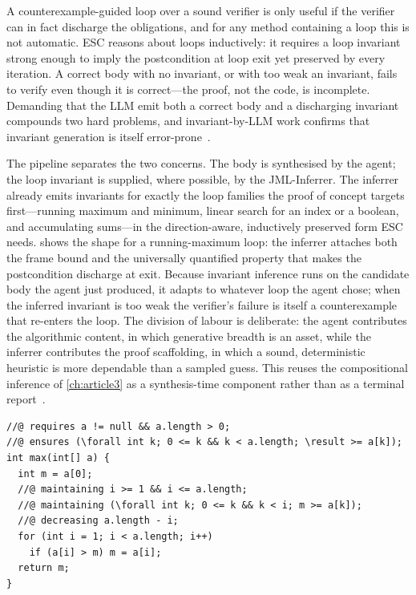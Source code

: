 A counterexample-guided loop over a sound verifier is only useful if the verifier can in fact discharge the obligations, and for any method containing a loop this is not automatic. ESC reasons about loops inductively: it requires a loop invariant strong enough to imply the postcondition at loop exit yet preserved by every iteration. A correct body with no invariant, or with too weak an invariant, fails to verify even though it is correct---the proof, not the code, is incomplete. Demanding that the LLM emit both a correct body and a discharging invariant compounds two hard problems, and invariant-by-LLM work confirms that invariant generation is itself error-prone~\cite{kamath2023loopy,chakraborty2023ranking,pei2023llminvariants}.

The pipeline separates the two concerns. The body is synthesised by the agent; the loop invariant is supplied, where possible, by the JML-Inferrer. The inferrer already emits invariants for exactly the loop families the proof of concept targets first---running maximum and minimum, linear search for an index or a boolean, and accumulating sums---in the direction-aware, inductively preserved form ESC needs.  shows the shape for a running-maximum loop: the inferrer attaches both the frame bound and the universally quantified property that makes the postcondition discharge at exit. Because invariant inference runs on the candidate body the agent just produced, it adapts to whatever loop the agent chose; when the inferred invariant is too weak the verifier's failure is itself a counterexample that re-enters the loop. The division of labour is deliberate: the agent contributes the algorithmic content, in which generative breadth is an asset, while the inferrer contributes the proof scaffolding, in which a sound, deterministic heuristic is more dependable than a sampled guess. This reuses the compositional inference of \cref{ch:article3} as a synthesis-time component rather than as a terminal report~\cite{edmonds_article3}.

\begin{lstlisting}[style=code,caption={A loop body synthesised by the agent (running maximum) annotated with the loop invariant supplied by the inferrer; the quantified clause is what lets ESC discharge the postcondition at loop exit.},label={lst:a5-invariant}]
//@ requires a != null && a.length > 0;
//@ ensures (\forall int k; 0 <= k && k < a.length; \result >= a[k]);
int max(int[] a) {
  int m = a[0];
  //@ maintaining i >= 1 && i <= a.length;
  //@ maintaining (\forall int k; 0 <= k && k < i; m >= a[k]);
  //@ decreasing a.length - i;
  for (int i = 1; i < a.length; i++)
    if (a[i] > m) m = a[i];
  return m;
}
\end{lstlisting}

